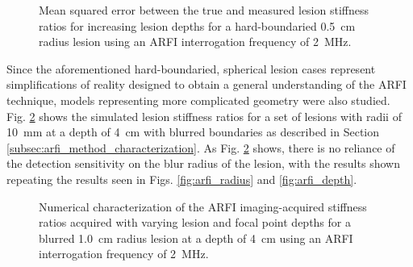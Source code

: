 			\begin{figure}[!htb]
				\centering
				\caption[ARFI imaging-acquired lesion stiffness mean squared error related to lesion depth]{Mean squared error between the true and measured lesion stiffness ratios for increasing lesion depths for a hard-boundaried \SI{0.5}{cm} radius lesion using an ARFI interrogation frequency of \SI{2}{\MHz}.}
				\label{fig:arfi_depth_mse}
			\end{figure}

			Since the aforementioned hard-boundaried, spherical lesion cases represent simplifications of reality designed to obtain a general understanding of the ARFI technique, models representing more complicated geometry were also studied. Fig. \ref{fig:arfi_blur} shows the simulated lesion stiffness ratios for a set of lesions with radii of \SI{10}{\mm} at a depth of \SI{4}{\cm} with blurred boundaries as described in Section \ref{subsec:arfi_method_characterization}. As Fig. \ref{fig:arfi_blur} shows, there is no reliance of the detection sensitivity on the blur radius of the lesion, with the results shown repeating the results seen in Figs. \ref{fig:arfi_radius} and \ref{fig:arfi_depth}.

			\begin{figure}[!htb]
				\centering
				\caption[Numerical characterization of ARFI imaging-acquired stiffness ratio with blurred lesions]{Numerical characterization of the ARFI imaging-acquired stiffness ratios acquired with varying lesion and focal point depths for a blurred \SI{1.0}{cm} radius lesion at a depth of \SI{4}{\cm} using an ARFI interrogation frequency of \SI{2}{\MHz}.}
				\label{fig:arfi_blur}
			\end{figure}

